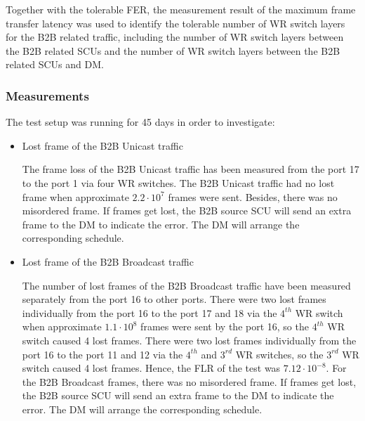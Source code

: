 Together with the tolerable FER, the measurement result of the maximum frame transfer latency was used to identify the tolerable number of WR switch layers for the B2B related traffic, including the number of WR switch layers between the B2B related SCUs and the number of WR switch layers between the B2B related SCUs and DM. 


\subsubsection{Measurements}
The test setup was running for 45 days in order to investigate: 
\begin{itemize}
    \item Lost frame of the B2B Unicast traffic

The frame loss of the B2B Unicast traffic has been measured from the port 17 to the port 1 via four WR switches. The B2B Unicast traffic had no lost frame when approximate $2.2\cdot 10^{7}$ frames were sent. Besides, there was no misordered frame. If frames get lost, the B2B source SCU will send an extra frame to the DM to indicate the error. The DM will arrange the corresponding schedule.

    \item Lost frame of the B2B Broadcast traffic

 


The number of lost frames of the B2B Broadcast traffic have been measured separately from the port 16 to other ports. There were two lost frames individually from the port 16 to the port 17 and 18 via the $4^{th}$ WR switch when approximate $1.1\cdot 10^{8}$ frames were sent by the port 16, so the $4^{th}$ WR switch caused 4 lost frames. There were two lost frames individually from the port 16 to the port 11 and 12 via the $4^{th}$ and $3^{rd}$ WR switches, so the $3^{rd}$ WR switch caused 4 lost frames. Hence, the FLR of the test was $7.12\cdot 10^{-8}$. For the B2B Broadcast frames, there was no misordered frame. If frames get lost, the B2B source SCU will send an extra frame to the DM to indicate the error. The DM will arrange the corresponding schedule.




\end{itemize}
